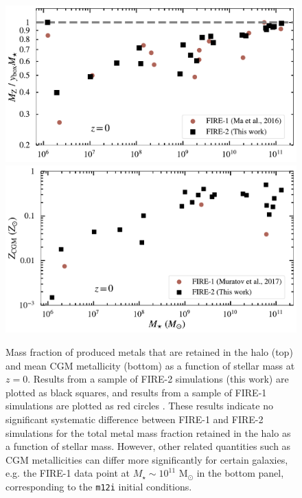 \documentclass[fleqn,usenatbib]{mnras}
\begin{document}
\begin{figure}
\includegraphics[width=\columnwidth]{figures/metal_mass_budget_snum600_comp.pdf}
\includegraphics[width=\columnwidth]{figures/cgm_met_comparison_snum600.pdf}
\caption{
Mass fraction of produced metals that are retained in the halo (top) and mean CGM metallicity (bottom) as a function of stellar mass at $z=0$. 
Results from a sample of FIRE-2 simulations (this work) are plotted as black squares, and results from a sample of FIRE-1 simulations are plotted as red circles \citep{Ma2015,Muratov2016}. 
These results indicate no significant systematic difference between FIRE-1 and FIRE-2 simulations for the total metal mass fraction retained in the halo as a function of stellar mass. 
However, other related quantities such as CGM metallicities can differ more significantly for certain galaxies, e.g. the FIRE-1 data point at $M_{\star} \sim 10^{11}$ M$_{\odot}$ in the bottom panel, corresponding to the {\tt m12i} initial conditions.
}
\label{fig:metal_mass_budget_comp}
\end{figure}
\end{document}
